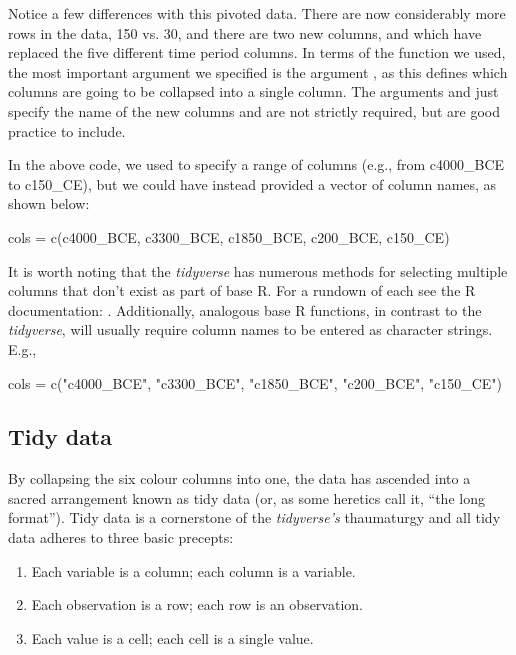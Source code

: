 Notice a few differences with this pivoted data. There are now considerably more rows in the data, 150 vs. 30, and there are two new columns,  and  which have replaced the five different time period columns. In terms of the  function we used, the most important argument we specified is the argument , as this defines which columns are going to be collapsed into a single column. The arguments  and  just specify the name of the new columns and are not strictly required, but are good practice to include.

In the above code, we used \R{:} to specify a range of columns (e.g., from c4000\_BCE to c150\_CE), but we could have instead provided a vector of column names, as shown below:

\begin{inR}
cols = c(c4000_BCE, c3300_BCE, c1850_BCE, c200_BCE, c150_CE)
\end{inR}
\vspace{1em}

\noindent It is worth noting that the \textit{tidyverse} has numerous methods for selecting multiple columns that don't exist as part of base R. For a rundown of each see the R documentation: . Additionally, analogous base R functions, in contrast to the \textit{tidyverse}, will usually require column names to be entered as character strings. E.g.,

\begin{inR}
cols = c("c4000_BCE", "c3300_BCE", "c1850_BCE", "c200_BCE", "c150_CE")
\end{inR}
\vspace{1em}

\subsection{Tidy data}

By collapsing the six colour columns into one, the data has ascended into a sacred arrangement known as \gls{tidy data} (or, as some heretics call it, ``the long format'').  Tidy data is a cornerstone of the \textit{tidyverse's} thaumaturgy and all tidy data adheres to three basic precepts:

\begin{minipage}{\textwidth}

\begin{enumerate}[label=\Roman*.]
\selectfont
    \item Each variable is a column; each column is a variable.
    \item Each observation is a row; each row is an observation.
    \item Each value is a cell; each cell is a single value.
\end{enumerate}
\end{minipage}

